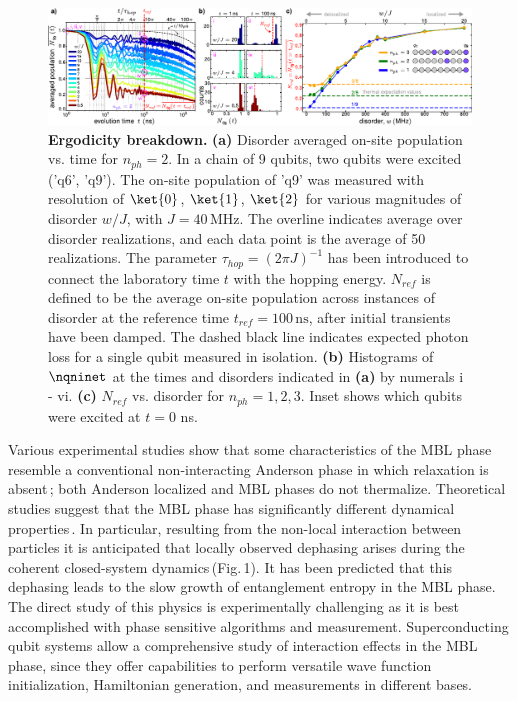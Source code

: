 \begin{figure}[t] %
\centering
\includegraphics[width=178mm]{./PDF/fig_2.pdf}
\vspace{-0.7em}
\caption{\small
\textbf{Ergodicity breakdown.} \textbf{(a)} Disorder averaged on-site population vs. time for $n_{ph}=2$. In a chain of 9 qubits, two qubits were excited ('q6', 'q9'). The on-site population of 'q9' was measured with resolution of $\ket{0}$, $\ket{1}$, $\ket{2}$ for various magnitudes of disorder $w/J$, with $J=40\,\text{MHz}$. The overline indicates average over disorder realizations, and each data point is the average of 50 realizations. The parameter $\tau_{hop}=\left(2 \pi J \right)^{-1}$ has been introduced to connect the laboratory time $t$ with the hopping energy. $N_{ref}$ is defined to be the average on-site population across instances of disorder at the reference time $t_{ref}=100\,\text{ns}$, after initial transients have been damped. The dashed black line indicates expected photon loss for a single qubit measured in isolation. \textbf{(b)} Histograms of $\nqninet$  at the times and disorders indicated in \textbf{(a)} by numerals i - vi. \textbf{(c)} $N_{ref}$ vs. disorder for $n_{ph}=1, 2, 3$. Inset shows which qubits were excited at $t=0$ ns.}
\vspace{-1em}
\end{figure}

Various experimental studies show that some characteristics of the MBL phase resemble a conventional non-interacting Anderson phase in which relaxation is absent\,\cite{BlochMBL2015, demarco2015, Monroe2015, GrossScience2016, Bordia2017, Roushan2018, Lukin2019}; both Anderson localized and MBL phases do not thermalize. Theoretical studies suggest that the MBL phase has significantly different dynamical properties\,\cite{Huse2007, Bardarson2012, Serbyn2013b, Huse2014, Serbyn2013, KnapPRL2014, Antonello2017, Serbyn2014, Yasaman2015,  Gopalakrishnan2015, Serbyn2015, Altman2015, ImbriePRL2016}. In particular, resulting from the non-local interaction between particles it is anticipated that locally observed dephasing arises during the coherent closed-system dynamics\,(Fig.\,1). It has been predicted that this dephasing leads to the slow growth of entanglement entropy in the MBL phase. The direct study of this physics is experimentally challenging as it is best accomplished with phase sensitive algorithms and measurement. Superconducting qubit systems allow a comprehensive study of interaction effects in the MBL phase, since they offer capabilities to perform versatile wave function initialization, Hamiltonian generation, and measurements in different bases.


